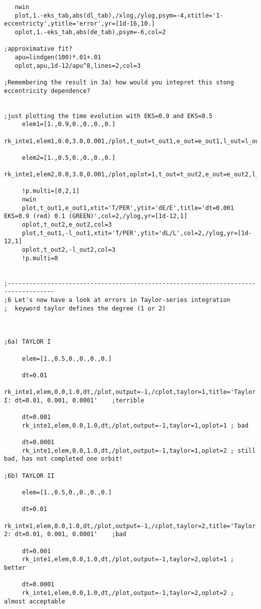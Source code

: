 \documentclass[12pt,landscape]{article}
\begin{document}
\begin{verbatim}
   nwin
   plot,1.-eks_tab,abs(dl_tab),/xlog,/ylog,psym=-4,xtitle='1-eccentricty',ytitle='error',yr=[1d-16,10.]
   oplot,1.-eks_tab,abs(de_tab),psym=-6,col=2

;approximative fit?
   apu=lindgen(100)*.01+.01
   oplot,apu,1d-12/apu^8,lines=2,col=3

;Remembering the result in 3a) how would you intepret this stong eccentricity dependence?


;just plotting the time evolution with EKS=0.9 and EKS=0.5
     elem1=[1.,0.9,0.,0.,0.,0.]
     rk_inte1,elem1,0.0,3.0,0.001,/plot,t_out=t_out1,e_out=e_out1,l_out=l_out1,output=-1

     elem2=[1.,0.5,0.,0.,0.,0.]
     rk_inte1,elem2,0.0,3.0,0.001,/plot,oplot=1,t_out=t_out2,e_out=e_out2,l_out=l_out2,output=-1

     !p.multi=[0,2,1]
     nwin
     plot,t_out1,e_out1,xtit='T/PER',ytit='dE/E',title='dt=0.001 EKS=0.9 (red) 0.1 (GREEN)',col=2,/ylog,yr=[1d-12,1]
     oplot,t_out2,e_out2,col=3
     plot,t_out1,-l_out1,xtit='T/PER',ytit='dL/L',col=2,/ylog,yr=[1d-12,1]
     oplot,t_out2,-l_out2,col=3
     !p.multi=0


;-----------------------------------------------------------------------------------
;6 Let's now have a look at errors in Taylor-series integration
;  keyword taylor defines the degree (1 or 2)

     

;6a) TAYLOR I

     elem=[1.,0.5,0.,0.,0.,0.]

     dt=0.01
     rk_inte1,elem,0.0,1.0,dt,/plot,output=-1,/cplot,taylor=1,title='Taylor I: dt=0.01, 0.001, 0.0001'    ;terrible

     dt=0.001
     rk_inte1,elem,0.0,1.0,dt,/plot,output=-1,taylor=1,oplot=1 ; bad

     dt=0.0001
     rk_inte1,elem,0.0,1.0,dt,/plot,output=-1,taylor=1,oplot=2 ; still bad, has not completed one orbit!

;6b) TAYLOR II

     elem=[1.,0.5,0.,0.,0.,0.]

     dt=0.01
     rk_inte1,elem,0.0,1.0,dt,/plot,output=-1,/cplot,taylor=2,title='Taylor 2: dt=0.01, 0.001, 0.0001'    ;bad

     dt=0.001
     rk_inte1,elem,0.0,1.0,dt,/plot,output=-1,taylor=2,oplot=1 ; better

     dt=0.0001
     rk_inte1,elem,0.0,1.0,dt,/plot,output=-1,taylor=2,oplot=2 ; almost acceptable



\end{verbatim}
\end{document}
